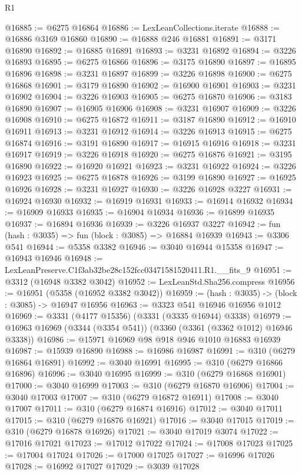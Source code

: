 \begin{lexlean}{R1}
\begin{coremodule}
@16885 := @6275 @16864
@16886 := LexLeanCollections.iterate
@16888 := @16886 @3169 @16860
@16890 := @16888 @246 @16881
@16891 := @3171 @16890
@16892 := @16885 @16891
@16893 := @3231 @16892
@16894 := @3226 @16893
@16895 := @6275 @16866
@16896 := @3175 @16890
@16897 := @16895 @16896
@16898 := @3231 @16897
@16899 := @3226 @16898
@16900 := @6275 @16868
@16901 := @3179 @16890
@16902 := @16900 @16901
@16903 := @3231 @16902
@16904 := @3226 @16903
@16905 := @6275 @16870
@16906 := @3183 @16890
@16907 := @16905 @16906
@16908 := @3231 @16907
@16909 := @3226 @16908
@16910 := @6275 @16872
@16911 := @3187 @16890
@16912 := @16910 @16911
@16913 := @3231 @16912
@16914 := @3226 @16913
@16915 := @6275 @16874
@16916 := @3191 @16890
@16917 := @16915 @16916
@16918 := @3231 @16917
@16919 := @3226 @16918
@16920 := @6275 @16876
@16921 := @3195 @16890
@16922 := @16920 @16921
@16923 := @3231 @16922
@16924 := @3226 @16923
@16925 := @6275 @16878
@16926 := @3199 @16890
@16927 := @16925 @16926
@16928 := @3231 @16927
@16930 := @3226 @16928 @3227
@16931 := @16924 @16930
@16932 := @16919 @16931
@16933 := @16914 @16932
@16934 := @16909 @16933
@16935 := @16904 @16934
@16936 := @16899 @16935
@16937 := @16894 @16936
@16939 := @3226 @16937 @3227
@16942 := fun (hash : @3035) => fun (block : @3085) => @16884 @16939
@16943 := @3306 @541
@16944 := @5358 @3382
@16946 := @3040 @16944 @15358
@16947 := @16943 @16946
@16948 := LexLeanPreserve.C1f3ab32be28c152fcc03471581520411.R1.__fits_9
@16951 := @3312 (@16948 @3382 @3042)
@16952 := LexLeanStd.Sha256.compress
@16956 := @16951 (@5358 (@16952 @3382 @3042))
@16959 := (hash : @3035) -> (block : @3085) -> @16947 @16956
@16963 := @3323 @541 @16946 @16956 @1012
@16969 := @3331 (@4177 @15356) (@3331 (@3335 @16944) @3338)
@16979 := @16963 @16969 (@3344 (@3354 @541)) (@3360 (@3361 (@3362 @1012) @16946 @3338))
@16986 := @15971 @16969 @98 @918 @946 @1010 @16883 @16939
@16987 := @15939 @16890
@16988 := @16986 @16987
@16991 := @310 (@6279 @16864 @16891)
@16992 := @3040 @16991
@16995 := @310 (@6279 @16866 @16896)
@16996 := @3040 @16995
@16999 := @310 (@6279 @16868 @16901)
@17000 := @3040 @16999
@17003 := @310 (@6279 @16870 @16906)
@17004 := @3040 @17003
@17007 := @310 (@6279 @16872 @16911)
@17008 := @3040 @17007
@17011 := @310 (@6279 @16874 @16916)
@17012 := @3040 @17011
@17015 := @310 (@6279 @16876 @16921)
@17016 := @3040 @17015
@17019 := @310 (@6279 @16878 @16926)
@17021 := @3040 @17019 @3074
@17022 := @17016 @17021
@17023 := @17012 @17022
@17024 := @17008 @17023
@17025 := @17004 @17024
@17026 := @17000 @17025
@17027 := @16996 @17026
@17028 := @16992 @17027
@17029 := @3039 @17028

\end{coremodule}
\end{lexlean}
